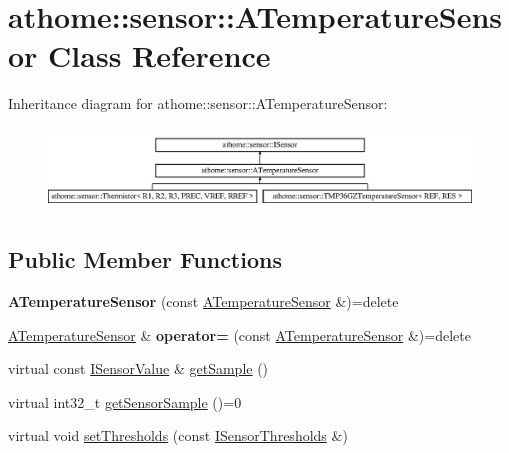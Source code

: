 \hypertarget{classathome_1_1sensor_1_1_a_temperature_sensor}{}\section{athome\+:\+:sensor\+:\+:A\+Temperature\+Sensor Class Reference}
\label{classathome_1_1sensor_1_1_a_temperature_sensor}
Inheritance diagram for athome\+:\+:sensor\+:\+:A\+Temperature\+Sensor\+:\begin{figure}[H]
\begin{center}
\leavevmode
\includegraphics[height=2.204725cm]{classathome_1_1sensor_1_1_a_temperature_sensor}
\end{center}
\end{figure}
\subsection*{Public Member Functions}
\begin{DoxyCompactItemize}
\item 
\mbox{\label{classathome_1_1sensor_1_1_a_temperature_sensor_adc643a183aa4e4ae6b6c8c9212aa6525}} 
{\bfseries A\+Temperature\+Sensor} (const \mbox{\hyperlink{classathome_1_1sensor_1_1_a_temperature_sensor}{A\+Temperature\+Sensor}} \&)=delete
\item 
\mbox{\label{classathome_1_1sensor_1_1_a_temperature_sensor_a0eb5857e7a283d824b183eb55239e9fe}} 
\mbox{\hyperlink{classathome_1_1sensor_1_1_a_temperature_sensor}{A\+Temperature\+Sensor}} \& {\bfseries operator=} (const \mbox{\hyperlink{classathome_1_1sensor_1_1_a_temperature_sensor}{A\+Temperature\+Sensor}} \&)=delete
\item 
virtual const \mbox{\hyperlink{structathome_1_1sensor_1_1_i_sensor_1_1_i_sensor_value}{I\+Sensor\+Value}} \& \mbox{\hyperlink{classathome_1_1sensor_1_1_a_temperature_sensor_afea6a461b8dff9ee736aa508aa4f6a3c}{get\+Sample}} ()
\item 
virtual int32\+\_\+t \mbox{\hyperlink{classathome_1_1sensor_1_1_a_temperature_sensor_a4e5b2c79ab69f6903f7b322da45b0af4}{get\+Sensor\+Sample}} ()=0
\item 
virtual void \mbox{\hyperlink{classathome_1_1sensor_1_1_a_temperature_sensor_a1c323184ac116784e877151895dfd080}{set\+Thresholds}} (const \mbox{\hyperlink{structathome_1_1sensor_1_1_i_sensor_1_1_i_sensor_thresholds}{I\+Sensor\+Thresholds}} \&)
\end{DoxyCompactItemize}
